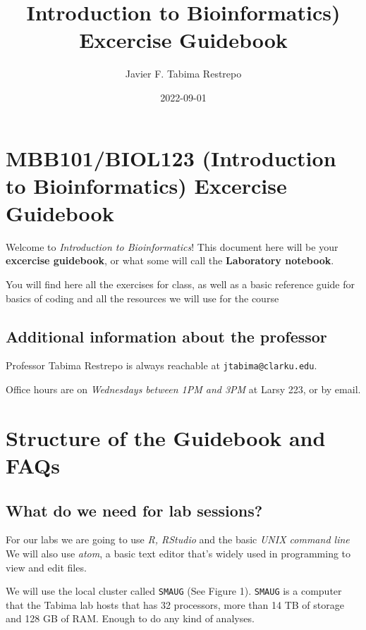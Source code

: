 \documentclass[
]{book}
\title{Introduction to Bioinformatics) Excercise Guidebook}
\author{Javier F. Tabima Restrepo}
\date{2022-09-01}
\begin{document}
\maketitle

{
\setcounter{tocdepth}{1}
\tableofcontents
}
\hypertarget{intro}{%
\chapter{MBB101/BIOL123 (Introduction to Bioinformatics) Excercise Guidebook}\label{intro}}

Welcome to \emph{Introduction to Bioinformatics}! This document here will be your \textbf{excercise guidebook}, or what some will call the \textbf{Laboratory notebook}.

You will find here all the exercises for class, as well as a basic reference guide for basics of coding and all the resources we will use for the course

\hypertarget{additional-information-about-the-professor}{%
\section*{Additional information about the professor}\label{additional-information-about-the-professor}}

Professor Tabima Restrepo is always reachable at \texttt{jtabima@clarku.edu}.

Office hours are on \emph{Wednesdays between 1PM and 3PM} at Larsy 223, or by email.

\hypertarget{structure-of-the-guidebook-and-faqs}{%
\chapter{Structure of the Guidebook and FAQs}\label{structure-of-the-guidebook-and-faqs}}

\hypertarget{what-do-we-need-for-lab-sessions}{%
\section{What do we need for lab sessions?}\label{what-do-we-need-for-lab-sessions}}

For our labs we are going to use \emph{R, RStudio} and the basic \emph{UNIX command line}
We will also use \emph{atom}, a basic text editor that's widely used in programming to view and edit files.

We will use the local cluster called \texttt{SMAUG} (See Figure 1). \texttt{SMAUG} is a computer that the Tabima lab hosts that has 32 processors, more than 14 TB of storage and 128 GB of RAM. Enough to do any kind of analyses.
\end{document}
